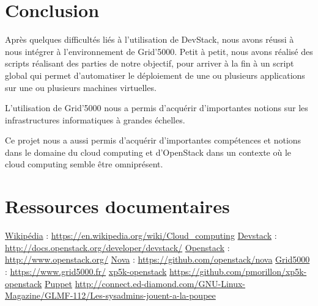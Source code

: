 \documentclass{report}
\begin{document}
\newpage
\chapter{Conclusion}
    Après quelques difficultés liés à l'utilisation de DevStack, nous avons réussi à nous intégrer à l'environnement de Grid'5000. Petit à petit, nous avons réalisé des scripts réalisant des parties de notre objectif, pour arriver à la fin à un script global qui permet d'automatiser le déploiement de une ou plusieurs applications sur une ou plusieurs machines virtuelles.\bigbreak


    L'utilisation de Grid'5000 nous a permis d'acquérir d'importantes notions sur les infrastructures informatiques à grandes échelles.\bigbreak

    Ce projet nous a aussi permis d'acquérir d'importantes compétences et notions dans le domaine du cloud computing et d'OpenStack dans un contexte où le cloud computing semble être omniprésent.\bigbreak


\newpage
\chapter*{Ressources documentaires}
\href{https://en.wikipedia.org/wiki/Cloud_computing}{Wikipédia} :
\url{https://en.wikipedia.org/wiki/Cloud_computing}
\bigbreak
\href{http://docs.openstack.org/developer/devstack/}{Devstack} :
\url{http://docs.openstack.org/developer/devstack/}
\bigbreak
\href{http://www.openstack.org/}{Openstack} :
\url{http://www.openstack.org/}
\bigbreak
\href{https://github.com/openstack/nova}{Nova} :
\url{https://github.com/openstack/nova}
\bigbreak
\href{https://www.grid5000.fr/}{Grid5000} :
\url{https://www.grid5000.fr/}
\bigbreak
\href{https://github.com/pmorillon/xp5k-openstack}{xp5k-openstack}
\url{https://github.com/pmorillon/xp5k-openstack}
\bigbreak
\href{http://connect.ed-diamond.com/GNU-Linux-Magazine/GLMF-112/Les-sysadmins-jouent-a-la-poupee}{Puppet}
\url{http://connect.ed-diamond.com/GNU-Linux-Magazine/GLMF-112/Les-sysadmins-jouent-a-la-poupee}


\printbibliography


\newpage
\end{document}
